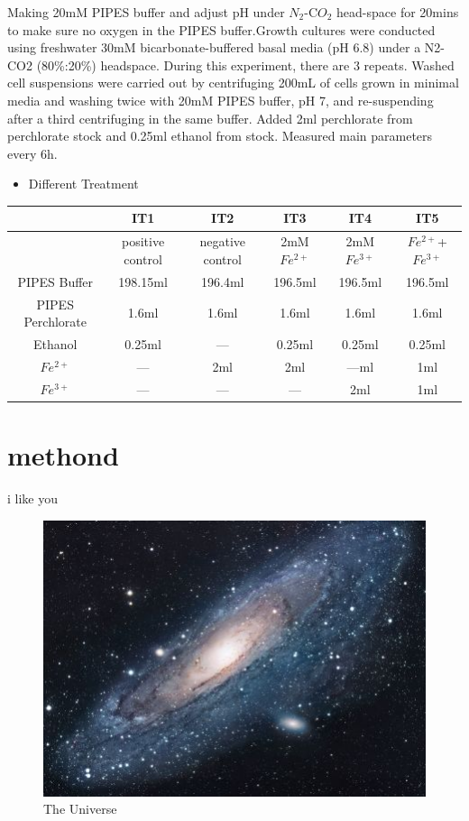 \documentclass{article}
\begin{document}
Making 20mM PIPES buffer and adjust pH under $N_{2}$-C$O_{2}$ head-space for 20mins to make sure no oxygen in the PIPES buffer.Growth cultures were conducted using freshwater 30mM bicarbonate-buffered basal media (pH 6.8) under a N2-CO2 (80\%:20\%) headspace. During this experiment, there are 3 repeats. Washed cell suspensions were carried out by centrifuging 200mL of cells grown in minimal media and washing twice with 20mM PIPES buffer, pH 7, and re-suspending after a third centrifuging in the same buffer.	Added 2ml perchlorate from perchlorate stock and 0.25ml ethanol from stock. Measured main parameters every 6h.
\begin{itemize}
\item Different Treatment 
\end{itemize}

\centering
\begin{tabular}{c|c|c|c|c|c}

     & IT1& IT2& IT3& IT4& IT5 \\
     \hline 
      & positive control & negative control &2mM $Fe^{2+}$& 2mM $Fe^{3+}$& $Fe^{2+}$+$Fe^{3+}$\\
     PIPES Buffer& 198.15ml& 196.4ml& 196.5ml& 196.5ml& 196.5ml\\PIPES Perchlorate & 1.6ml& 1.6ml&1.6ml& 1.6ml& 1.6ml\\
     Ethanol & 0.25ml& --- & 0.25ml& 0.25ml& 0.25ml\\
     $Fe^{2+}$ & ---& 2ml&2ml& ---ml& 1ml\\
     $Fe^{3+}$ &---& ---&---& 2ml& 1ml\\
    
     
\end{tabular}

\section{methond}
i like you 
\textbf{}
\begin{figure}[h!]
\centering
\includegraphics[scale=1.7]{universe}
\caption{The Universe}
\label{fig:universe}
\end{figure}
\end{document}
